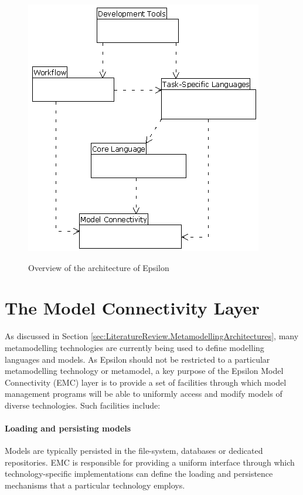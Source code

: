 \begin{figure}
	\centering
		\includegraphics{images/EpsilonArchitecture}
	\label{fig:EpsilonArchitecture}
	\caption{Overview of the architecture of Epsilon}
\end{figure}

\section{The Model Connectivity Layer}
\label{sec:Architecture.EMC}

As discussed in Section \ref{sec:LiteratureReview.MetamodellingArchitectures}, many metamodelling technologies are currently being used to define modelling languages and models. As Epsilon should not be restricted to a particular metamodelling technology or metamodel, a key purpose of the Epsilon Model Connectivity (EMC) layer is to provide a set of facilities through which model management programs will be able to uniformly access and modify models of diverse technologies. Such facilities include:

\paragraph{Loading and persisting models} Models are typically persisted in the file-system, databases or dedicated repositories. EMC is responsible for providing a uniform interface through which technology-specific implementations can define the loading and persistence mechanisms that a particular technology employs.


